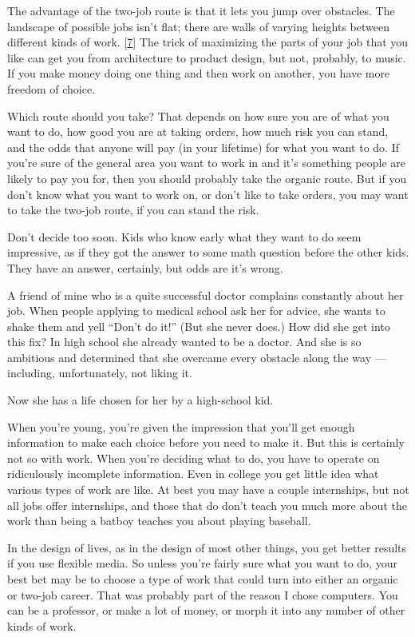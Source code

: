 The advantage of the two-job route is that it lets you jump over
obstacles. The landscape of possible jobs isn't flat; there are walls of
varying heights between different kinds of work. {[}\hyperref[f7n]{7}{]}
The trick of maximizing the parts of your job that you like can get you
from architecture to product design, but not, probably, to music. If you
make money doing one thing and then work on another, you have more
freedom of choice.

Which route should you take? That depends on how sure you are of what
you want to do, how good you are at taking orders, how much risk you can
stand, and the odds that anyone will pay (in your lifetime) for what you
want to do. If you're sure of the general area you want to work in and
it's something people are likely to pay you for, then you should
probably take the organic route. But if you don't know what you want to
work on, or don't like to take orders, you may want to take the two-job
route, if you can stand the risk.

Don't decide too soon. Kids who know early what they want to do seem
impressive, as if they got the answer to some math question before the
other kids. They have an answer, certainly, but odds are it's wrong.

A friend of mine who is a quite successful doctor complains constantly
about her job. When people applying to medical school ask her for
advice, she wants to shake them and yell ``Don't do it!'' (But she never
does.) How did she get into this fix? In high school she already wanted
to be a doctor. And she is so ambitious and determined that she overcame
every obstacle along the way --- including, unfortunately, not liking
it.

Now she has a life chosen for her by a high-school kid.

When you're young, you're given the impression that you'll get enough
information to make each choice before you need to make it. But this is
certainly not so with work. When you're deciding what to do, you have to
operate on ridiculously incomplete information. Even in college you get
little idea what various types of work are like. At best you may have a
couple internships, but not all jobs offer internships, and those that
do don't teach you much more about the work than being a batboy teaches
you about playing baseball.

In the design of lives, as in the design of most other things, you get
better results if you use flexible media. So unless you're fairly sure
what you want to do, your best bet may be to choose a type of work that
could turn into either an organic or two-job career. That was probably
part of the reason I chose computers. You can be a professor, or make a
lot of money, or morph it into any number of other kinds of work.

